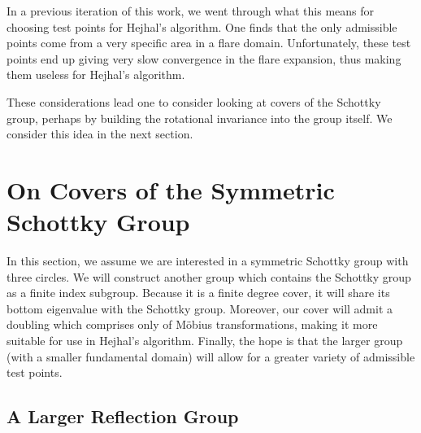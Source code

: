 \documentclass[]{article}
\begin{document}
In a previous iteration of this work, we went through what this means for choosing test points for Hejhal's algorithm.
One finds that the only admissible points come from a very specific area in a flare domain.
Unfortunately, these test points end up giving very slow convergence in the flare expansion, thus making them useless for Hejhal's algorithm.

These considerations lead one to consider looking at covers of the Schottky group, perhaps by building the rotational invariance into the group itself.
We consider this idea in the next section.

\section*{On Covers of the Symmetric Schottky Group}

In this section, we assume we are interested in a symmetric Schottky group with three circles.
We will construct another group which contains the Schottky group as a finite index subgroup.
Because it is a finite degree cover, it will share its bottom eigenvalue with the Schottky group.
Moreover, our cover will admit a doubling which comprises only of M\"obius transformations, making it more suitable for use in Hejhal's algorithm.
Finally, the hope is that the larger group (with a smaller fundamental domain) will allow for a greater variety of admissible test points.

\subsection*{A Larger Reflection Group}
\end{document}
